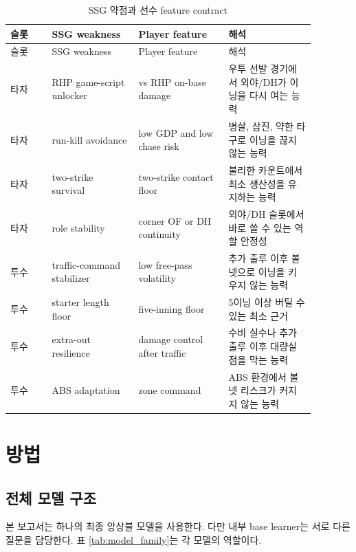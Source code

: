 \documentclass[11pt,a4paper]{article}
\begin{document}
\begin{longtable}{L{0.12\linewidth}L{0.25\linewidth}L{0.26\linewidth}L{0.25\linewidth}}
\caption{SSG 약점과 선수 feature contract}
\label{tab:feature_contract}\\
\toprule
슬롯 & SSG weakness & Player feature & 해석 \\
\midrule
\endfirsthead
\toprule
슬롯 & SSG weakness & Player feature & 해석 \\
\midrule
\endhead
타자 & RHP game-script unlocker & vs RHP on-base damage & 우투 선발 경기에서 외야/DH가 이닝을 다시 여는 능력 \\
타자 & run-kill avoidance & low GDP and low chase risk & 병살, 삼진, 약한 타구로 이닝을 끊지 않는 능력 \\
타자 & two-strike survival & two-strike contact floor & 불리한 카운트에서 최소 생산성을 유지하는 능력 \\
타자 & role stability & corner OF or DH continuity & 외야/DH 슬롯에서 바로 쓸 수 있는 역할 안정성 \\
투수 & traffic-command stabilizer & low free-pass volatility & 추가 출루 이후 볼넷으로 이닝을 키우지 않는 능력 \\
투수 & starter length floor & five-inning floor & 5이닝 이상 버틸 수 있는 최소 근거 \\
투수 & extra-out resilience & damage control after traffic & 수비 실수나 추가 출루 이후 대량실점을 막는 능력 \\
투수 & ABS adaptation & zone command & ABS 환경에서 볼넷 리스크가 커지지 않는 능력 \\
\bottomrule
\end{longtable}

\section{방법}

\subsection{전체 모델 구조}
본 보고서는 하나의 최종 앙상블 모델을 사용한다. 다만 내부 base learner는 서로 다른 질문을 담당한다. 표 \ref{tab:model_family}는 각 모델의 역할이다.
\end{document}
